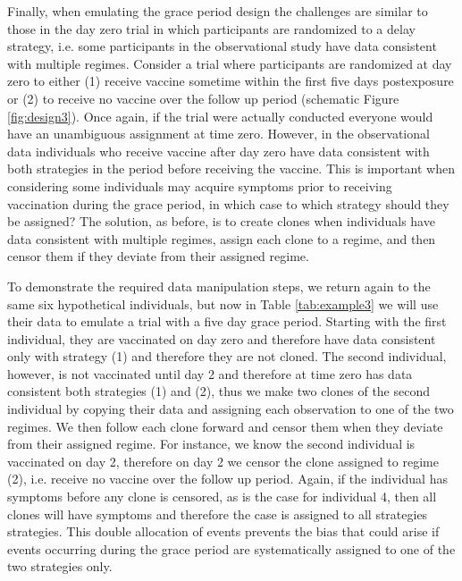 \begin{appendix}
    Finally, when emulating the grace period design the challenges are similar to those in the day zero trial in which participants are randomized to a delay strategy, i.e. some participants in the observational study have data consistent with multiple regimes. Consider a trial where participants are randomized at day zero to either (1) receive vaccine sometime within the first five days postexposure or (2) to receive no vaccine over the follow up period (schematic Figure \ref{fig:design3}). Once again, if the trial were actually conducted everyone would have an unambiguous assignment at time zero. However, in the observational data individuals who receive vaccine after day zero have data consistent with both strategies in the period before receiving the vaccine. This is important when considering some individuals may acquire symptoms prior to receiving vaccination during the grace period, in which case to which strategy should they be assigned? The solution, as before, is to create clones when individuals have data consistent with multiple regimes, assign each clone to a regime, and then censor them if they deviate from their assigned regime. 

    To demonstrate the required data manipulation steps, we return again to the same six hypothetical individuals, but now in Table \ref{tab:example3} we will use their data to emulate a trial with a five day grace period. Starting with the first individual, they are vaccinated on day zero and therefore have data consistent only with strategy (1) and therefore they are not cloned. The second individual, however, is not vaccinated until day 2 and therefore at time zero has data consistent both strategies (1) and (2), thus we make two clones of the second individual by copying their data and assigning each observation to one of the two regimes. We then follow each clone forward and censor them when they deviate from their assigned regime. For instance, we know the second individual is vaccinated on day 2, therefore on day 2 we censor the clone assigned to regime (2), i.e. receive no vaccine over the follow up period. Again, if the individual has symptoms before any clone is censored, as is the case for individual 4, then all clones will have symptoms and therefore the case is assigned to all strategies strategies. This double allocation of events prevents the bias that could arise if events occurring during the grace period are systematically assigned to one of the two strategies only. 


\end{appendix}

